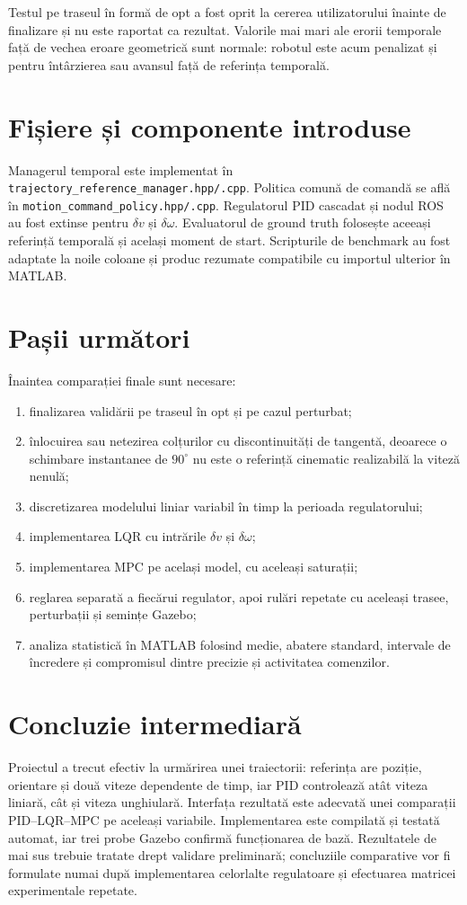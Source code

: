 \documentclass[12pt,a4paper]{article}
\begin{document}
Testul pe traseul în formă de opt a fost oprit la cererea utilizatorului înainte
de finalizare și nu este raportat ca rezultat. Valorile mai mari ale erorii
temporale față de vechea eroare geometrică sunt normale: robotul este acum
penalizat și pentru întârzierea sau avansul față de referința temporală.

\section{Fișiere și componente introduse}

Managerul temporal este implementat în
\texttt{trajectory\_reference\_manager.hpp/.cpp}. Politica comună de comandă se
află în \texttt{motion\_command\_policy.hpp/.cpp}. Regulatorul PID cascadat și
nodul ROS au fost extinse pentru $\delta v$ și $\delta\omega$. Evaluatorul de
ground truth folosește aceeași referință temporală și același moment de start.
Scripturile de benchmark au fost adaptate la noile coloane și produc rezumate
compatibile cu importul ulterior în MATLAB.

\section{Pașii următori}

Înaintea comparației finale sunt necesare:
\begin{enumerate}
  \item finalizarea validării pe traseul în opt și pe cazul perturbat;
  \item înlocuirea sau netezirea colțurilor cu discontinuități de tangentă,
  deoarece o schimbare instantanee de $90^{\circ}$ nu este o referință cinematic
  realizabilă la viteză nenulă;
  \item discretizarea modelului liniar variabil în timp la perioada regulatorului;
  \item implementarea LQR cu intrările $\delta v$ și $\delta\omega$;
  \item implementarea MPC pe același model, cu aceleași saturații;
  \item reglarea separată a fiecărui regulator, apoi rulări repetate cu aceleași
  trasee, perturbații și semințe Gazebo;
  \item analiza statistică în MATLAB folosind medie, abatere standard, intervale
  de încredere și compromisul dintre precizie și activitatea comenzilor.
\end{enumerate}

\section{Concluzie intermediară}

Proiectul a trecut efectiv la urmărirea unei traiectorii: referința are poziție,
orientare și două viteze dependente de timp, iar PID controlează atât viteza
liniară, cât și viteza unghiulară. Interfața rezultată este adecvată unei
comparații PID--LQR--MPC pe aceleași variabile. Implementarea este compilată și
testată automat, iar trei probe Gazebo confirmă funcționarea de bază. Rezultatele
de mai sus trebuie tratate drept validare preliminară; concluziile comparative
vor fi formulate numai după implementarea celorlalte regulatoare și efectuarea
matricei experimentale repetate.
\end{document}
